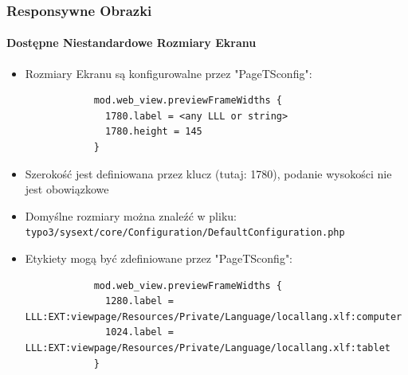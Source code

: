 
\begin{frame}[fragile]
	\frametitle{Responsywne Obrazki}
	\framesubtitle{Dostępne Niestandardowe Rozmiary Ekranu}

	\begin{itemize}
		\item Rozmiary Ekranu są konfigurowalne przez "PageTSconfig":


		\begin{lstlisting}
			mod.web_view.previewFrameWidths {
			  1780.label = <any LLL or string>
			  1780.height = 145
			}
		\end{lstlisting}

		\item Szerokość jest definiowana przez klucz (tutaj: 1780), podanie wysokości nie jest obowiązkowe
		\item Domyślne rozmiary można znaleźć w pliku:\newline
			\small\texttt{typo3/sysext/core/Configuration/DefaultConfiguration.php}\normalsize
		\item Etykiety mogą być zdefiniowane przez "PageTSconfig":

		\begin{lstlisting}
			mod.web_view.previewFrameWidths {
			  1280.label = LLL:EXT:viewpage/Resources/Private/Language/locallang.xlf:computer
			  1024.label = LLL:EXT:viewpage/Resources/Private/Language/locallang.xlf:tablet
			}
		\end{lstlisting}

	\end{itemize}

\end{frame}


